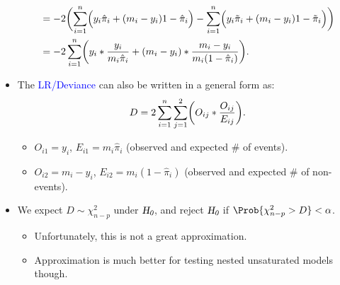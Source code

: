 \documentclass[oneside]{book}\usepackage[]{graphicx}\usepackage[svgnames]{xcolor}
\let\log\relax%
\newcommand{\HN}{\textsl{H}_{\textsl{0}}}%
\begin{document}
\begin{itemize}
\begin{align*}
                   & =-2\biggl(\sum_{i=1}^{n}\Bigl(y_i\log{\hat{\pi}_i}+(m_i-y_i)\log{1-\hat{\pi}_i}\Bigr)
                  -\sum_{i=1}^{n}\Bigl(y_i\log{\tilde{\pi}_i}+(m_i-y_i)\log{1-\tilde{\pi}_i}\Bigr)\biggr)                                       \\
                   & =-2 \sum_{i=1}^{n} \biggl(y_i\log*{\frac{y_i}{m_i\hat{\pi}_i}}+(m_i-y_i)\log*{\frac{m_i-y_i}{m_i(1-\hat{\pi}_i)} }\biggr).
            \end{align*}
      \item The \textcolor{Blue}{LR/Deviance} can also be written in a general form as:
            \[ D=2 \sum_{i=1}^{n} \sum_{j=1}^{2} \biggl(O_{ij}\log*{\frac{O_{ij}}{E_{ij}}}\biggr). \]
            \begin{itemize}
                  \item $ O_{i1}=y_i $, $ E_{i1}=m_i\hat{\pi}_i $ (observed and expected \# of events).
                  \item $ O_{i2}=m_i-y_i $, $ E_{i2}=m_i(1-\hat{\pi}_i) $ (observed and expected \# of non-events).
            \end{itemize}
      \item We expect $ D \sim \chi^2_{n-p} $ under $ \HN $, and reject $ \HN $ if $ \Prob{\chi^2_{n-p}>D}<\alpha $.
            \begin{itemize}
                  \item Unfortunately, this is not a great approximation.
                  \item Approximation is much better for testing nested unsaturated models though.
            \end{itemize}
\end{itemize}
\end{document}
